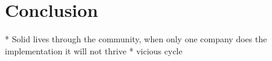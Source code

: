 \chapter{Conclusion}

* Solid lives through the community, when only one company does the implementation it will not thrive
* vicious cycle
